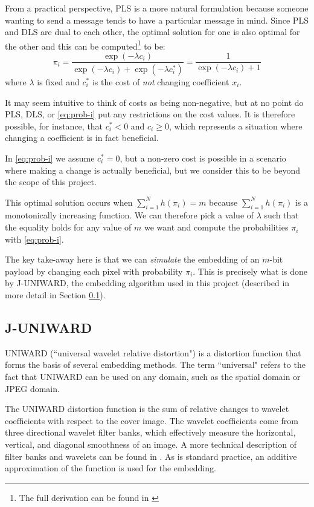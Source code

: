 \documentclass[11pt,a4paper,twoside,openright]{report}
\begin{document}
From a practical perspective, PLS is a more natural formulation because someone wanting to send a message tends to have a particular message in mind. Since PLS and DLS are dual to each other, the optimal solution for one is also optimal for the other and this can be computed\footnote{The full derivation can be found in \cite{stc-paper}} to be:
	\begin{equation} \label{eq:prob-i}
		\pi_i = \frac{\exp{(-\lambda c_i)}}{\exp{(-\lambda c_i)} + \exp{(-\lambda c_i^{\ast})}} = \frac{1}{\exp{(-\lambda c_i)} + 1}
	\end{equation}
where $\lambda$ is fixed and $c_i^{\ast}$ is the cost of \textit{not} changing coefficient $x_i$.

It may seem intuitive to think of costs as being non-negative, but at no point do PLS, DLS, or \eqref{eq:prob-i} put any restrictions on the cost values. It is therefore possible, for instance, that $c_i^{\ast} < 0$ and $c_i \geq 0$, which represents a situation where changing a coefficient is in fact beneficial.

In \eqref{eq:prob-i} we assume $c_i^{\ast} = 0$, but a non-zero cost is possible in a scenario where making a change is actually beneficial, but we consider this to be beyond the scope of this project.

This optimal solution occurs when $\sum_{i=1}^{N} h(\pi_i) = m$ because $\sum_{i=1}^{N} h(\pi_i)$ is a monotonically increasing function. We can therefore pick a value of $\lambda$ such that the equality holds for any value of $m$ we want and compute the probabilities $\pi_i$ with \eqref{eq:prob-i}.

The key take-away here is that we can \textit{simulate} the embedding of an $m$-bit payload by changing each pixel with probability $\pi_i$. This is precisely what is done by J-UNIWARD, the embedding algorithm used in this project (described in more detail in Section \ref{sec:juniward}).


\subsection{J-UNIWARD} \label{sec:juniward}

UNIWARD (``universal wavelet relative distortion") \cite{uniward-paper} is a distortion function that forms the basis of several embedding methods. The term ``universal" refers to the fact that UNIWARD can be used on any domain, such as the spatial domain or JPEG domain.

The UNIWARD distortion function is the sum of relative changes to wavelet coefficients with respect to the cover image. The wavelet coefficients come from three directional wavelet filter banks, which effectively measure the horizontal, vertical, and diagonal smoothness of an image. A more technical description of filter banks and wavelets can be found in \cite{uniward-paper}. As is standard practice, an additive approximation of the function is used for the embedding.
\end{document}
